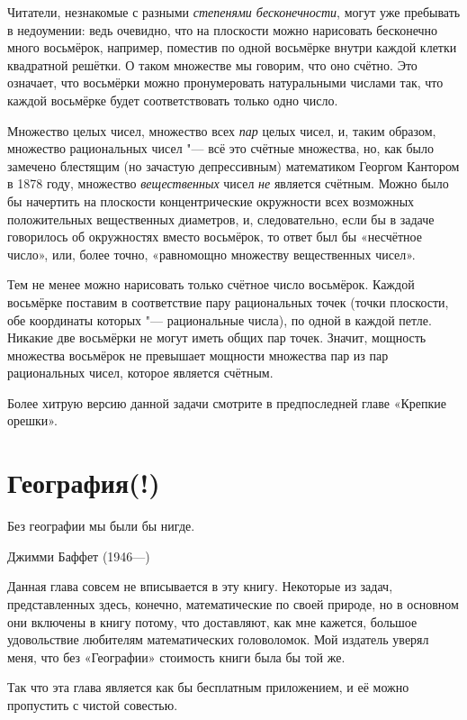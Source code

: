 \documentclass[twoside]{book}
\begin{document}
Читатели, незнакомые с разными \emph{степенями бесконечности}, могут уже пребывать в недоумении: ведь очевидно, что на плоскости можно нарисовать бесконечно много восьмёрок, например, поместив по одной восьмёрке внутри каждой клетки квадратной решётки.
О таком множестве мы говорим, что оно счётно. 
Это означает, что восьмёрки можно пронумеровать натуральными числами так, что каждой восьмёрке будет соответствовать только одно число.

\medskip

Множество целых чисел, множество всех \emph{пар} целых чисел, и, таким образом, множество рациональных чисел "--- всё это счётные множества, но, как было замечено блестящим (но зачастую депрессивным) математиком Георгом Кантором в 1878 году, множество \emph{вещественных} чисел \emph{не} является счётным.
Можно было бы начертить на плоскости концентрические окружности всех возможных положительных вещественных диаметров, и, следовательно, если бы в задаче говорилось об окружностях вместо восьмёрок, то ответ был бы «несчётное число», или, более точно, «равномощно множеству вещественных чисел».

Тем не менее можно нарисовать только счётное число восьмёрок.
Каждой восьмёрке поставим в соответствие пару рациональных точек (точки плоскости, обе координаты которых "--- рациональные числа), по одной в каждой петле.
Никакие две восьмёрки не могут иметь общих пар точек.
Значит, мощность множества восьмёрок не превышает мощности множества пар из пар рациональных чисел, которое является счётным.\heart

Более хитрую версию данной задачи смотрите в предпоследней главе «Крепкие орешки».

\chapter{География(!)}

\setlength{\epigraphwidth}{.4\textwidth}
\epigraph{Без географии мы были бы нигде.\vspace{1ex}}{Джимми Баффет (1946---)} 

Данная глава совсем не вписывается в эту книгу.
Некоторые из задач, представленных здесь, конечно, математические по своей природе, %
но в основном они включены в книгу потому, что доставляют, как мне кажется, большое удовольствие любителям математических головоломок.
Мой издатель уверял меня, что без «Географии» стоимость книги была бы той же.

Так что эта глава является как бы бесплатным приложением, и её можно пропустить с чистой совестью.
\end{document}
